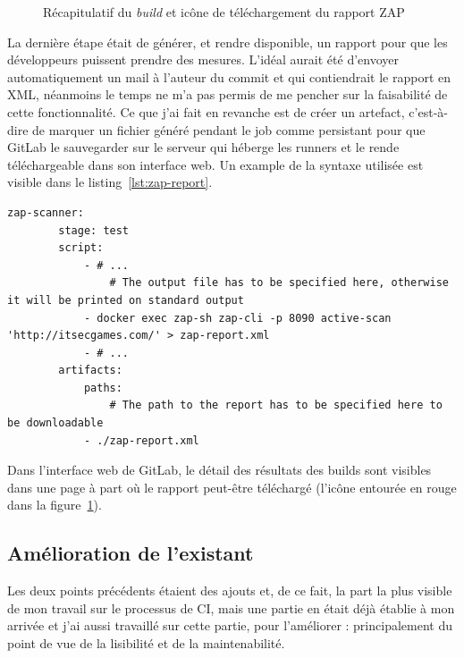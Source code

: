 \begin{figure}[h]
	\centering
	\caption{Récapitulatif du \textit{build} et icône de téléchargement du rapport ZAP}
	\label{fig:gitlab_build_recap}
\end{figure}

La dernière étape était de générer, et rendre disponible, un rapport pour que les développeurs puissent prendre des mesures. L'idéal aurait été d'envoyer automatiquement un mail à l'auteur du commit et qui contiendrait le rapport en XML, néanmoins le temps ne m'a pas permis de me pencher sur la faisabilité de cette fonctionnalité. Ce que j'ai  fait en revanche est de créer un artefact, c'est-à-dire de marquer un fichier généré pendant le job comme persistant pour que GitLab le sauvegarder sur le serveur qui héberge les runners et le rende téléchargeable dans son interface web. Un example de la syntaxe utilisée est visible dans le listing~\ref{lst:zap-report}.

\begin{minipage}{\linewidth}
	\begin{lstlisting}[caption={Extrait de code qui lance un scanner ZAP en ligne de commande et rend le rapport disponible sur GitLab},label={lst:zap-report}]
		zap-scanner:
		stage: test
		script:
			- # ...
				# The output file has to be specified here, otherwise it will be printed on standard output
			- docker exec zap-sh zap-cli -p 8090 active-scan 'http://itsecgames.com/' > zap-report.xml 
			- # ...
		artifacts:
			paths:
				# The path to the report has to be specified here to be downloadable 
			- ./zap-report.xml
\end{lstlisting}
\end{minipage}

Dans l'interface web de GitLab, le détail des résultats des builds sont visibles dans une page à part où le rapport peut-être téléchargé (l'icône entourée en rouge dans la figure~\ref{fig:gitlab_build_recap}).

\subsection{Amélioration de l'existant}
Les deux points précédents étaient des ajouts et, de ce fait, la part la plus visible de mon travail sur le processus de CI, mais une partie en était déjà établie à mon arrivée et j'ai aussi travaillé sur cette partie, pour l'améliorer : principalement du point de vue de la lisibilité et de la maintenabilité.


